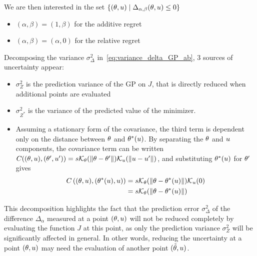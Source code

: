 \documentclass[../../Main_ManuscritThese.tex]{subfiles}
\begin{document}
We are then interested in the set $\{(\theta, u) \mid \Delta_{\alpha, \beta}(\theta, u) \leq 0\}$
\begin{itemize}
\item $(\alpha, \beta) = (1, \beta)$ for the additive regret
\item $(\alpha, \beta) = (\alpha, 0)$ for the relative regret
\end{itemize}



Decomposing the variance $\sigma^2_{\Delta}$ in~\cref{eq:variance_delta_GP_ab}, 3 sources of uncertainty appear:
\begin{itemize}
\item $\sigma^2_{Z}$ is the prediction variance of the GP on $J$, that is directly reduced when additional points are evaluated
\item $\sigma^2_{Z^*}$ is the variance of the predicted value of the minimizer.
\item Assuming a stationary form of the covariance, the third term is dependent only on the distance between $\theta$ and $\theta^*(u)$. By separating the $\theta$ and $u$ components, the covariance term can be written $C((\theta,u), (\theta^{\prime},u^{\prime})) = s \mathcal{K}_{\theta}(\|\theta - \theta^{\prime}\|) \mathcal{K}_{u}(\|u - u^{\prime}\|)$, and
  substituting $\theta^*(u)$ for $\theta^{\prime}$ gives
\begin{align}
  C\left((\theta,u),(\theta^*(u),u)\right) &= s  \mathcal{K}_{\theta}(\|\theta - \theta^*(u)\|) \mathcal{K}_{u}(0) \\
                                           &= s  \mathcal{K}_{\theta}(\|\theta - \theta^*(u)\|)
\end{align}
\end{itemize}
This decomposition highlights the fact that the prediction error $\sigma_{\Delta}^2$ of the difference $\Delta_{\alpha}$ measured at a point $(\theta, u)$ will not be reduced completely by evaluating the function $J$ at this point, as only the prediction variance $\sigma_Z^2$ will be significantly affected in general. In other words, reducing the uncertainty at a point $(\theta, u)$ may need the evaluation of another point $(\tilde{\theta},u)$.
\end{document}
